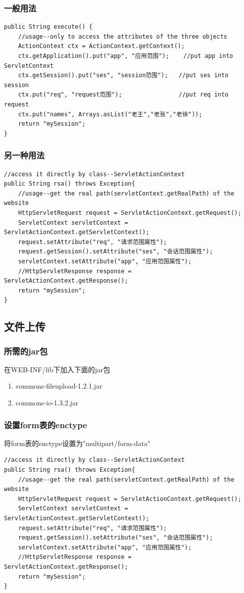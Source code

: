 \subsubsection{一般用法}
\begin{lstlisting}[style=JAVA]
public String execute() {
	//usage--only to access the attributes of the three objects
	ActionContext ctx = ActionContext.getContext();
	ctx.getApplication().put("app", "应用范围");	//put app into ServletContext
	ctx.getSession().put("ses", "session范围");	//put ses into session
	ctx.put("req", "request范围");				//put req into request
	ctx.put("names", Arrays.asList("老王","老张","老徐"));
	return "mySession";
}
\end{lstlisting}

\subsubsection{另一种用法}
\begin{lstlisting}[style=JAVA]
//access it directly by class--ServletActionContext
public String rsa() throws Exception{
	//usage--get the real path(servletContext.getRealPath) of the website
	HttpServletRequest request = ServletActionContext.getRequest();
	ServletContext servletContext = ServletActionContext.getServletContext();
	request.setAttribute("req", "请求范围属性");
	request.getSession().setAttribute("ses", "会话范围属性");
	servletContext.setAttribute("app", "应用范围属性");
	//HttpServletResponse response = ServletActionContext.getResponse();
	return "mySession";
}
\end{lstlisting}


\subsection{文件上传}
\subsubsection{所需的jar包}
在WEB-INF/lib下加入下面的jar包
\begin{enumerate}
\item commons-fileupload-1.2.1.jar
\item commons-io-1.3.2.jar
\end{enumerate}

\subsubsection{设置form表的enctype}
将form表的enctype设置为"multipart/form-data"
\begin{lstlisting}[style=JAVA]
//access it directly by class--ServletActionContext
public String rsa() throws Exception{
	//usage--get the real path(servletContext.getRealPath) of the website
	HttpServletRequest request = ServletActionContext.getRequest();
	ServletContext servletContext = ServletActionContext.getServletContext();
	request.setAttribute("req", "请求范围属性");
	request.getSession().setAttribute("ses", "会话范围属性");
	servletContext.setAttribute("app", "应用范围属性");
	//HttpServletResponse response = ServletActionContext.getResponse();
	return "mySession";
}
\end{lstlisting}



